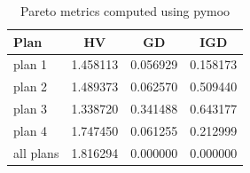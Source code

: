 \begin{table}[h!]
\centering
\begin{tabular}{lccc}
\hline
Plan & HV & GD & IGD \\
\hline
plan 1 & 1.458113 & 0.056929 & 0.158173 \\
plan 2 & 1.489373 & 0.062570 & 0.509440 \\
plan 3 & 1.338720 & 0.341488 & 0.643177 \\
plan 4 & 1.747450 & 0.061255 & 0.212999 \\
all plans & 1.816294 & 0.000000 & 0.000000 \\
\hline
\end{tabular}
\caption{Pareto metrics computed using pymoo}
\end{table}